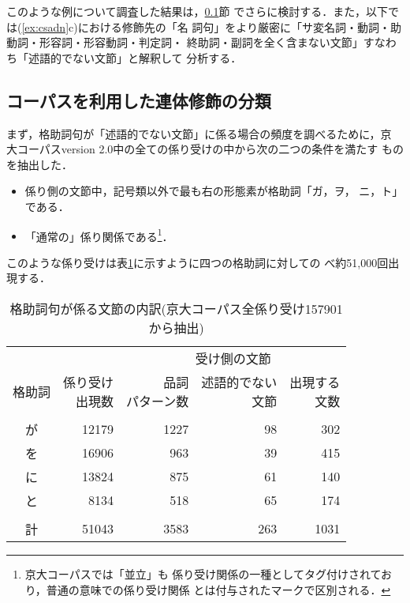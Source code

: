 このような例について調査した結果は，\ref{sec:adn:crpsadj}節
でさらに検討する．また，以下では(\ref{ex:csadn}c)における修飾先の「名
詞句」をより厳密に「サ変名詞・動詞・助動詞・形容詞・形容動詞・判定詞・
終助詞・副詞を全く含まない文節」すなわち「述語的でない文節」と解釈して
分析する．


\subsection{コーパスを利用した連体修飾の分類}\label{sec:adn:crpsadj}

まず，格助詞句が「述語的でない文節」に係る場合の頻度を調べるために，京
大コーパスversion 2.0中の全ての係り受けの中から次の二つの条件を満たす
ものを抽出した．
\begin{itemize}
\item[1.] 係り側の文節中，記号類以外で最も右の形態素が格助詞「ガ，ヲ，
ニ，ト」である．
\item[2.] 「通常の」係り関係である\footnote{京大コーパスでは「並立」も
係り受け関係の一種としてタグ付けされており，普通の意味での係り受け関係
とは付与されたマークで区別される．}．
\end{itemize}
このような係り受けは表\ref{tbl:all}に示すように四つの格助詞に対しての
べ約51,000回出現する．
\begin{table}
\caption{格助詞句が係る文節の内訳(京大コーパス全係り受け157901から抽出)}
\label{tbl:all}
\begin{center}
\begin{tabular}{c|r|r|r|r}
		&& \multicolumn{3}{c}{受け側の文節}\\[2pt]
\cline{3-5}
\rule{0pt}{25pt}格助詞 & \shortstack{係り受け\\[-2pt] 出現数} &
	\shortstack{品詞\\[-2pt] パターン数} &
	\shortstack{述語的でない\\[-2pt] 文節} &
	\shortstack{出現する\\[-2pt] 文数}\\[2pt]
\hline
&&&&\\[-7pt]
が & 12179 & 1227 &  98 & 302\\[2pt]
を & 16906 &  963 &  39 & 415\\[2pt]
に & 13824 &  875 &  61 & 140\\[2pt]
と &  8134 &  518 &  65 & 174\\[2pt]
\hline
&&&&\\[-7pt]
計 & 51043 & 3583 & 263 & 1031
\end{tabular}
\end{center}
\end{table}

